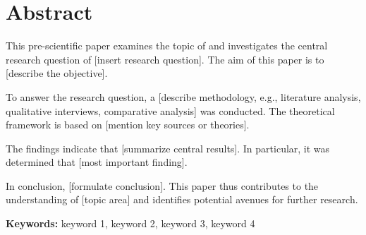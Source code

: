 
\chapter*{Abstract}


This pre-scientific paper examines the topic of \grqq{}
and investigates the central research question of [insert research question].
The aim of this paper is to [describe the objective].

To answer the research question, a [describe methodology, e.g., literature
analysis, qualitative interviews, comparative analysis] was conducted.
The theoretical framework is based on [mention key sources or theories].

The findings indicate that [summarize central results]. In particular,
it was determined that [most important finding].

In conclusion, [formulate conclusion]. This paper thus contributes to
the understanding of [topic area] and identifies potential avenues
for further research.

\vskip 5mm
\noindent\textbf{Keywords:} keyword 1, keyword 2, keyword 3, keyword 4
